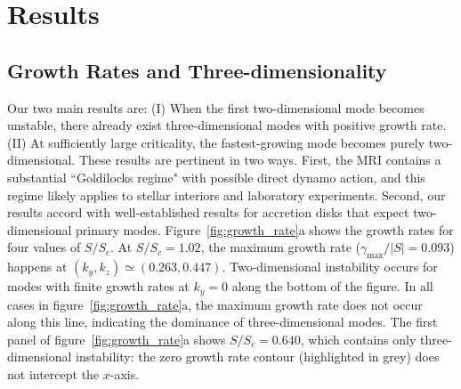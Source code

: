 \documentclass[openacc]{rsproca_new}%
\newcommand{\SSC}{S/S_{c}}
\begin{document}
\section{Results}
\label{sec:results}

\subsection{Growth Rates and Three-dimensionality}
\label{sec:growth}

Our two main results are: 
(I) When the first two-dimensional mode becomes unstable, there already exist three-dimensional modes with positive growth rate. 
(II) At sufficiently large criticality, the fastest-growing mode becomes purely two-dimensional. 
These results are pertinent in two ways. 
First, the MRI contains a substantial ``Goldilocks regime" with possible direct dynamo action, and this regime likely applies to stellar interiors and laboratory experiments. 
Second, our results accord with well-established results for accretion disks that expect two-dimensional primary modes.
Figure~\ref{fig:growth_rate}a shows the growth rates for four values of $\SSC$. 
At $\SSC=1.02$, the maximum growth rate ($\gamma_{\max}/|S|=0.093$) happens at $(k_{y},k_{z})\simeq(0.263,0.447)$.
Two-dimensional instability occurs for modes with finite growth rates at $k_y = 0$ along the bottom of the figure.
In all cases in figure~\ref{fig:growth_rate}a, the maximum growth rate does not occur along this line, indicating the dominance of three-dimensional modes.
The first panel of figure~\ref{fig:growth_rate}a shows $\SSC=0.640$, which contains only three-dimensional instability: the zero growth rate contour (highlighted in grey) does not intercept the $x$-axis.
\end{document}
